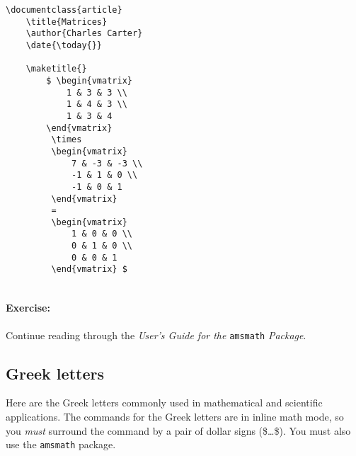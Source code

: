         \begin{verbatim}
\documentclass{article}
    \title{Matrices}
    \author{Charles Carter}
    \date{\today{}}
 
    \maketitle{}
        $ \begin{vmatrix}
            1 & 3 & 3 \\
            1 & 4 & 3 \\
            1 & 3 & 4 
        \end{vmatrix}
         \times 
         \begin{vmatrix}
             7 & -3 & -3 \\
             -1 & 1 & 0 \\
             -1 & 0 & 1
         \end{vmatrix}
         =
         \begin{vmatrix}
             1 & 0 & 0 \\
             0 & 1 & 0 \\
             0 & 0 & 1
         \end{vmatrix} $
    
        \end{verbatim}

		\paragraph{Exercise:}Continue reading through the \textit{User's Guide for the }\texttt{amsmath} \textit{Package}.

        \subsection{Greek letters}
        \label{Greek letters}
        

        Here are the Greek letters commonly used in mathematical and scientific applications. The \Lx{} commands for the Greek letters are in inline math mode, so you \textit{must} surround the command by a pair of dollar signs (\$\ldots\$). You must also use the \texttt{amsmath} package.

